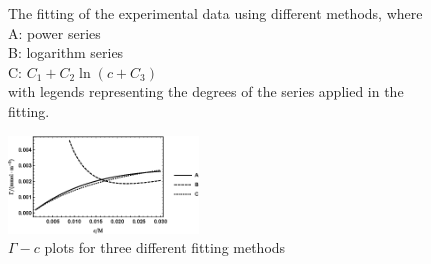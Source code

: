 \documentclass[%
 reprint,
 amsmath,amssymb,
 aps,
10.5pt,
]{revtex4-1}
\begin{document}
\begin{figure}
\centering
{}
\caption{The fitting of the experimental data using different methods, where\\A: power series\\B: logarithm series\\C: $C_1+C_2\ln{(c + C_3)}$\\with legends representing the degrees of the series applied in the fitting.}
\label{fit}
\end{figure}

\begin{figure}
\centering
\includegraphics[width=0.45\textwidth]{figures/Gibbs.eps}
\caption{$\Gamma-c$ plots for three different fitting methods}
\label{Gibbs}
\end{figure}
\end{document}
